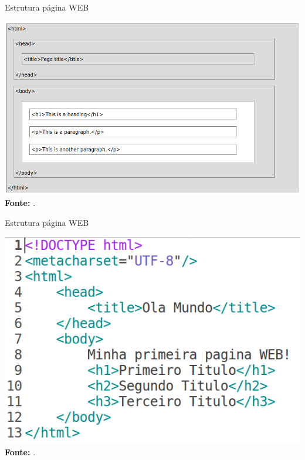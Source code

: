 \documentclass{beamer}
\begin{document}
\begin{frame}{Estrutura página WEB}
		\begin{center}
\includegraphics[height=0.65\paperheight]{fig/aula1/html_page.png} \\
    		\tiny \textbf{Fonte:} \cite{wschool2018html}.
		\end{center}
\end{frame}
\begin{frame}{Estrutura página WEB}
		\begin{center}
\includegraphics[height=0.65\paperheight]{fig/aula1/html1.png} \\
    		\tiny \textbf{Fonte:} \cite{wschool2021html}.
		\end{center}
\end{frame}
\end{document}
